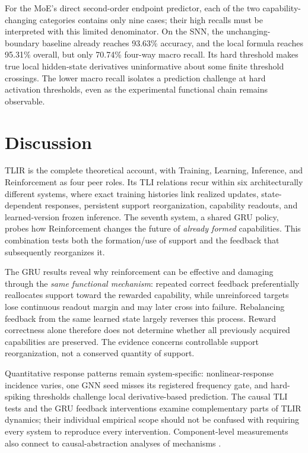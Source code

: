 \documentclass{article}
\begin{document}
For the MoE's direct second-order endpoint predictor, each of the two capability-changing categories contains only nine cases; their high recalls must be interpreted with this limited denominator. On the SNN, the unchanging-boundary baseline already reaches 93.63\% accuracy, and the local formula reaches 95.31\% overall, but only 70.74\% four-way macro recall. Its hard threshold makes true local hidden-state derivatives uninformative about some finite threshold crossings. The lower macro recall isolates a prediction challenge at hard activation thresholds, even as the experimental functional chain remains observable.

\section{Discussion}
TLIR is the complete theoretical account, with Training, Learning, Inference, and Reinforcement as four peer roles. Its TLI relations recur within six architecturally different systems, where exact training histories link realized updates, state-dependent responses, persistent support reorganization, capability readouts, and learned-version frozen inference. The seventh system, a shared GRU policy, probes how Reinforcement changes the future of \emph{already formed} capabilities. This combination tests both the formation/use of support and the feedback that subsequently reorganizes it.

The GRU results reveal why reinforcement can be effective and damaging through the \emph{same functional mechanism}: repeated correct feedback preferentially reallocates support toward the rewarded capability, while unreinforced targets lose continuous readout margin and may later cross into failure. Rebalancing feedback from the same learned state largely reverses this process. Reward correctness alone therefore does not determine whether all previously acquired capabilities are preserved. The evidence concerns controllable support reorganization, not a conserved quantity of support.

Quantitative response patterns remain system-specific: nonlinear-response incidence varies, one GNN seed misses its registered frequency gate, and hard-spiking thresholds challenge local derivative-based prediction. The causal TLI tests and the GRU feedback interventions examine complementary parts of TLIR dynamics; their individual empirical scope should not be confused with requiring every system to reproduce every intervention. Component-level measurements also connect to causal-abstraction analyses of mechanisms \cite{geiger2025}.
\end{document}
